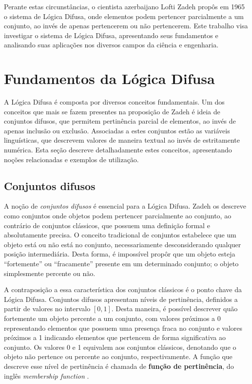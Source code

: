 \documentclass[12pt]{article}
\begin{document}
Perante estas circunstâncias, o cientista azerbaijano Lofti Zadeh propôs em 1965 o sistema de Lógica Difusa, onde elementos podem pertencer parcialmente a um conjunto, ao invés de apenas pertencerem ou não pertencerem. Este trabalho visa investigar o sistema de Lógica Difusa, apresentando seus fundamentos e analisando suas aplicações nos diversos campos da ciência e engenharia.

\section{Fundamentos da Lógica Difusa} \label{sec:fundaments}

A Lógica Difusa é composta por diversos conceitos fundamentais. Um dos conceitos que mais se fazem presentes na proposição de Zadeh é ideia de conjuntos difusos, que permitem pertinência parcial de elementos, ao invés de apenas inclusão ou exclusão. Associadas a estes conjuntos estão as variáveis linguísticas, que descrevem valores de maneira textual ao invés de estritamente numérica. Esta seção descreve detalhadamente estes conceitos, apresentando noções relacionadas e exemplos de utilização.

\subsection{Conjuntos difusos}

A noção de \textit{conjuntos difusos} é essencial para a Lógica Difusa. Zadeh os descreve como conjuntos onde objetos podem pertencer parcialmente ao conjunto, ao contrário de conjuntos clássicos, que possuem uma definição formal e absolutamente precisa. O conceito tradicional de conjuntos estabelece que um objeto está ou não está no conjunto, necessariamente desconsiderando qualquer posição intermediária. Desta forma, é impossível propôr que um objeto esteja ``fortemente'' ou ``fracamente'' presente em um determinado conjunto; o objeto simplesmente percente ou não.

A contraposição a essa característica dos conjuntos clássicos é o ponto chave da Lógica Difusa. Conjuntos difusos apresentam níveis de pertinência, definidos a partir de valores no intervalo $[0, 1]$. Desta maneira, é possível descrever quão fortemente um objeto percente a um conjunto, com valores próximos a 0 representando elementos que possuem uma presença fraca no conjunto e valores próximos a 1 indicando elementos que pertencem de forma significativa ao conjunto. Os valores 0 e 1 equivalem aos conjuntos clássicos, denotando que o objeto não pertence ou percente ao conjunto, respectivamente. A função que descreve esse nível de pertinência é chamada de \textbf{função de pertinência}, do inglês \textit{membership function} \cite{Zadeh1965}.
\end{document}
